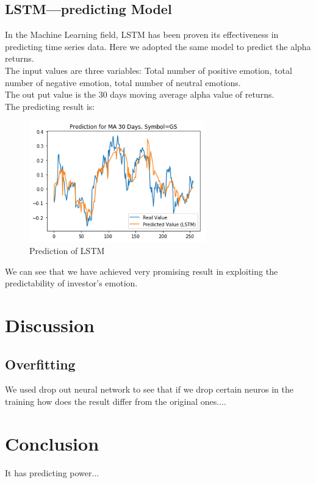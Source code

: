 \documentclass[preprint,12pt]{elsarticle}
\begin{document}
\subsection{LSTM---predicting Model}
	In the Machine Learning field, LSTM has been proven its effectiveness in predicting time series data. Here we adopted the same model to predict the alpha returns.\\
    The input values are three variables: Total number of positive emotion, total number of negative emotion, total number of neutral emotions.\\
    The out put value is the 30 days moving average alpha value of returns.\\
    The predicting result is:\\
\begin{figure}[H]
	\centering
\includegraphics[width=3in]{GS__.png}
	\caption{Prediction of LSTM}
\end{figure}
    We can see that we have achieved very promising result in exploiting the predictability of investor's emotion.
\section{Discussion}
\subsection{Overfitting}
	We used drop out neural network to see that if we drop certain neuros in the training how does the result differ from the original ones....

\section{Conclusion}
    It has predicting power...
    
   
    
   	
    
    
    
    
\end{document}
